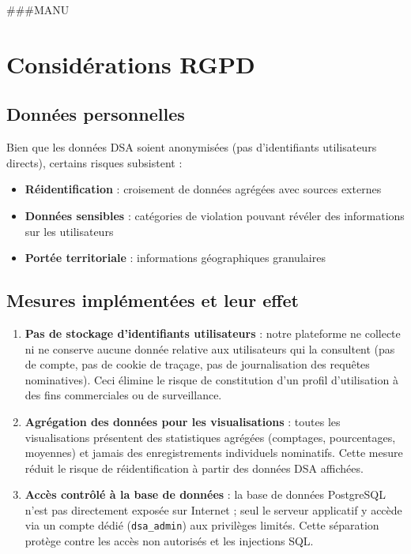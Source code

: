 \documentclass[10pt,twocolumn,a4paper]{article}
\begin{document}
###MANU

\section{Considérations RGPD}

\subsection{Données personnelles}

Bien que les données DSA soient anonymisées (pas d'identifiants utilisateurs directs), certains risques subsistent :

\begin{itemize}
    \item \textbf{Réidentification} : croisement de données agrégées avec sources externes
    \item \textbf{Données sensibles} : catégories de violation pouvant révéler des informations sur les utilisateurs
    \item \textbf{Portée territoriale} : informations géographiques granulaires
\end{itemize}

\subsection{Mesures implémentées et leur effet}

\begin{enumerate}
    \item \textbf{Pas de stockage d'identifiants utilisateurs} : notre plateforme ne collecte ni ne conserve aucune donnée relative aux utilisateurs qui la consultent (pas de compte, pas de cookie de traçage, pas de journalisation des requêtes nominatives). Ceci élimine le risque de constitution d'un profil d'utilisation à des fins commerciales ou de surveillance.
    \item \textbf{Agrégation des données pour les visualisations} : toutes les visualisations présentent des statistiques agrégées (comptages, pourcentages, moyennes) et jamais des enregistrements individuels nominatifs. Cette mesure réduit le risque de réidentification à partir des données DSA affichées.
    \item \textbf{Accès contrôlé à la base de données} : la base de données PostgreSQL n'est pas directement exposée sur Internet ; seul le serveur applicatif y accède via un compte dédié (\texttt{dsa\_admin}) aux privilèges limités. Cette séparation protège contre les accès non autorisés et les injections SQL.
\end{enumerate}
\end{document}
